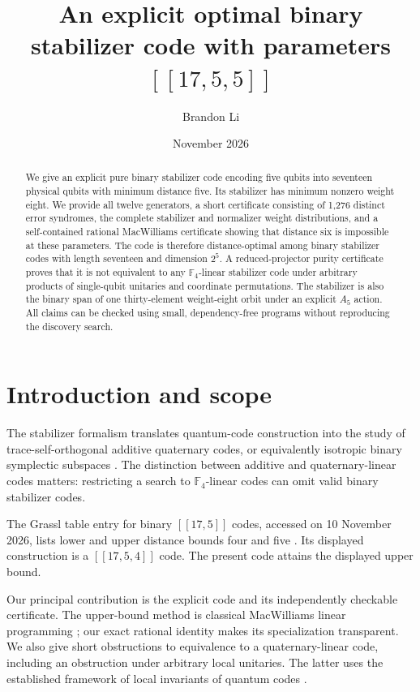 \documentclass[11pt]{article}
\title{An explicit optimal binary stabilizer code with parameters $[[17,5,5]]$}
\author{Brandon Li}
\date{November 2026}
\newcommand{\F}{\mathbb F}
\begin{document}
\maketitle
\begin{abstract}
We give an explicit pure binary stabilizer code encoding five qubits into seventeen physical qubits with minimum distance five. Its stabilizer has minimum nonzero weight eight. We provide all twelve generators, a short certificate consisting of 1,276 distinct error syndromes, the complete stabilizer and normalizer weight distributions, and a self-contained rational MacWilliams certificate showing that distance six is impossible at these parameters. The code is therefore distance-optimal among binary stabilizer codes with length seventeen and dimension $2^5$. A reduced-projector purity certificate proves that it is not equivalent to any $\F_4$-linear stabilizer code under arbitrary products of single-qubit unitaries and coordinate permutations. The stabilizer is also the binary span of one thirty-element weight-eight orbit under an explicit $A_5$ action. All claims can be checked using small, dependency-free programs without reproducing the discovery search.
\end{abstract}
\section{Introduction and scope}
The stabilizer formalism translates quantum-code construction into the study of trace-self-orthogonal additive quaternary codes, or equivalently isotropic binary symplectic subspaces \cite{crss}. The distinction between additive and quaternary-linear codes matters: restricting a search to $\F_4$-linear codes can omit valid binary stabilizer codes.

The Grassl table entry for binary $[[17,5]]$ codes, accessed on 10 November 2026, lists lower and upper distance bounds four and five \cite{grassl}. Its displayed construction is a $[[17,5,4]]$ code. The present code attains the displayed upper bound.

Our principal contribution is the explicit code and its independently checkable certificate. The upper-bound method is classical MacWilliams linear programming \cite{sl}; our exact rational identity makes its specialization transparent. We also give short obstructions to equivalence to a quaternary-linear code, including an obstruction under arbitrary local unitaries. The latter uses the established framework of local invariants of quantum codes \cite{rainsinv,localinv}.
\end{document}
